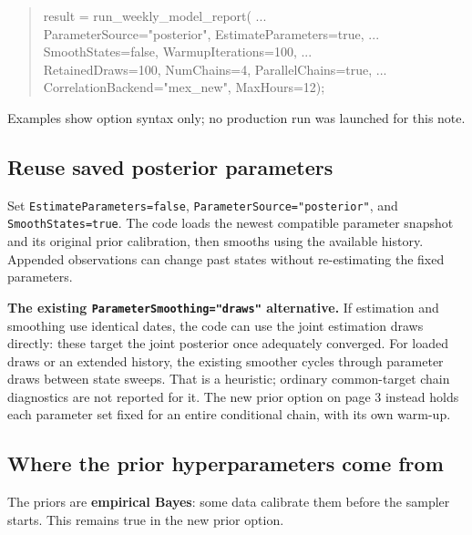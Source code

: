 \documentclass[10pt,a4paper]{article}
\newcommand{\code}[1]{\texttt{#1}}
\begin{document}
\begin{quote}\small\ttfamily
result = run\_weekly\_model\_report( ...\\
\hspace*{3mm}ParameterSource="posterior", EstimateParameters=true, ...\\
\hspace*{3mm}SmoothStates=false, WarmupIterations=100, ...\\
\hspace*{3mm}RetainedDraws=100, NumChains=4, ParallelChains=true, ...\\
\hspace*{3mm}CorrelationBackend="mex\_new", MaxHours=12);
\end{quote}
Examples show option syntax only; no production run was launched for this note.

\subsection*{Reuse saved posterior parameters}
Set \code{EstimateParameters=false}, \code{ParameterSource="posterior"},
and \code{SmoothStates=true}. The code loads the newest compatible parameter
snapshot and its original prior calibration, then smooths using the available
history. Appended observations can change past states without re-estimating
the fixed parameters.

\textbf{The existing \code{ParameterSmoothing="draws"} alternative.}
If estimation and smoothing use identical dates, the code can use the joint
estimation draws directly: these target the joint posterior once adequately
converged. For loaded draws or an extended history, the existing smoother
cycles through parameter draws between state sweeps. That is a heuristic;
ordinary common-target chain diagnostics are not reported for it. The new
prior option on page 3 instead holds each parameter set fixed for an entire
conditional chain, with its own warm-up.

\subsection*{Where the prior hyperparameters come from}
The priors are \textbf{empirical Bayes}: some data calibrate them before the
sampler starts. This remains true in the new prior option.
\end{document}
